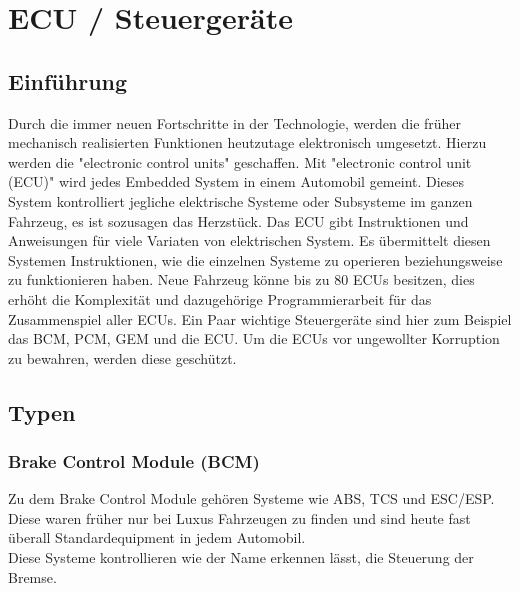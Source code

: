 \section{ECU / Steuergeräte}
    \subsection{Einführung}
    Durch die immer neuen Fortschritte in der Technologie, werden die früher mechanisch realisierten
    Funktionen heutzutage elektronisch umgesetzt. Hierzu werden die "electronic control units"
    geschaffen. Mit "electronic control unit (ECU)" wird jedes Embedded System in einem
    Automobil gemeint. Dieses System kontrolliert jegliche elektrische Systeme
    oder Subsysteme im ganzen Fahrzeug, es ist sozusagen das Herzstück. Das ECU gibt
    Instruktionen und Anweisungen für viele Variaten von elektrischen System. Es übermittelt
    diesen Systemen Instruktionen, wie die einzelnen Systeme zu operieren beziehungsweise
    zu funktionieren haben. Neue Fahrzeug könne bis zu 80 ECUs besitzen, dies erhöht die
    Komplexität und dazugehörige Programmierarbeit für das Zusammenspiel aller ECUs. Ein
    Paar wichtige Steuergeräte sind hier zum Beispiel das BCM, PCM, GEM und die ECU.
    Um die ECUs vor ungewollter Korruption zu bewahren, werden diese geschützt. 
    ~\cite{ECU.PB6} ~\cite{ECU.PB5} ~\cite{ECU.PB4} ~\cite{ECU.PB3} ~\cite{ECU.PB2} ~\cite{ECU.PB1}

    \subsection{Typen}
        \subsubsection{Brake Control Module (BCM)}
        Zu dem Brake Control Module gehören Systeme wie ABS, TCS und ESC/ESP. Diese waren früher
        nur bei Luxus Fahrzeugen zu finden und sind heute fast überall Standardequipment in jedem
        Automobil.\\
        Diese Systeme kontrollieren wie der Name erkennen lässt, die Steuerung der Bremse.

